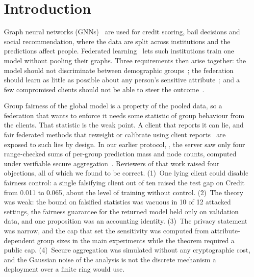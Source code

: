 \section{Introduction}\label{sec:intro}

Graph neural networks (GNNs)~\citep{kipf2016semi,velickovic2017graph} are used for credit scoring, bail decisions and social recommendation, where the data are split across institutions and the predictions affect people. Federated learning~\citep{mcmahan2017communication} lets such institutions train one model without pooling their graphs. Three requirements then arise together: the model should not discriminate between demographic groups~\citep{dai2021say,agarwal2021towards}; the federation should learn as little as possible about any person's sensitive attribute~\citep{abadi2016deep,mcmahan2018learning}; and a few compromised clients should not be able to steer the outcome~\citep{blanchard2017krum,yin2018byzantine,baruch2019little}.

Group fairness of the global model is a property of the pooled data, so a federation that wants to enforce it needs some statistic of group behaviour from the clients. That statistic is the weak point. A client that reports it can lie, and fair federated methods that reweight or calibrate using client reports~\citep{ezzeldin2023fairfed,li2020fair,fedfact2025} are exposed to such lies by design. In our earlier protocol, \clamp{}, the server saw only four range-checked sums of per-group prediction mass and node counts, computed under verifiable secure aggregation~\citep{bonawitz2017practical,corrigangibbs2017prio}. Reviewers of that work raised four objections, all of which we found to be correct. (1)~One lying client could disable fairness control: a single falsifying client out of ten raised the test gap on Credit from 0.011 to 0.065, about the level of training without control. (2)~The theory was weak: the bound on falsified statistics was vacuous in 10 of 12 attacked settings, the fairness guarantee for the returned model held only on validation data, and one proposition was an accounting identity. (3)~The privacy statement was narrow, and the cap that set the sensitivity was computed from attribute-dependent group sizes in the main experiments while the theorem required a public cap. (4)~Secure aggregation was simulated without any cryptographic cost, and the Gaussian noise of the analysis is not the discrete mechanism a deployment over a finite ring would use.

